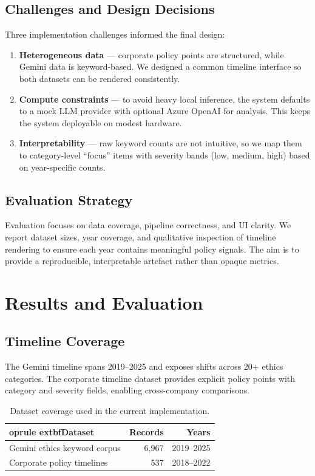 \documentclass[conference]{IEEEtran}
\begin{document}
\subsection*{Challenges and Design Decisions}
Three implementation challenges informed the final design:
\begin{enumerate}
  \item \textbf{Heterogeneous data} --- corporate policy points are structured,
  while Gemini data is keyword-based. We designed a common timeline interface
  so both datasets can be rendered consistently.
  \item \textbf{Compute constraints} --- to avoid heavy local inference, the
  system defaults to a mock LLM provider with optional Azure OpenAI for
  analysis. This keeps the system deployable on modest hardware.
  \item \textbf{Interpretability} --- raw keyword counts are not intuitive, so
  we map them to category-level ``focus'' items with severity bands (low,
  medium, high) based on year-specific counts.
\end{enumerate}

\subsection*{Evaluation Strategy}
Evaluation focuses on data coverage, pipeline correctness, and UI clarity.
We report dataset sizes, year coverage, and qualitative inspection of timeline
rendering to ensure each year contains meaningful policy signals. The aim is
to provide a reproducible, interpretable artefact rather than opaque metrics.

\section{Results and Evaluation}

\subsection*{Timeline Coverage}
The Gemini timeline spans 2019--2025 and exposes shifts across 20+ ethics
categories. The corporate timeline dataset provides explicit policy points
with category and severity fields, enabling cross-company comparisons.

\begin{table}[!htb]
  \renewcommand{\arraystretch}{1.1}
  \caption{Dataset coverage used in the current implementation.}
  \label{tab:datasets}
  \begin{tabular}{lrr}
    	oprule
    	extbf{Dataset} & \textbf{Records} & \textbf{Years} \\
    \midrule
    Gemini ethics keyword corpus & 6{,}967 & 2019--2025 \\
    Corporate policy timelines & 537 & 2018--2022 \\
    \bottomrule
  \end{tabular}
\end{table}
\end{document}
